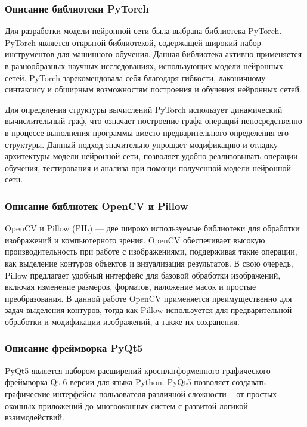 \subsubsection{Описание библиотеки PyTorch}
	
Для разработки модели нейронной сети была выбрана библиотека PyTorch. PyTorch является открытой библиотекой, содержащей широкий	набор инструментов для машинного обучения. Данная библиотека активно применяется в разнообразных научных исследованиях, использующих модели нейронных сетей. PyTorch зарекомендовала себя благодаря гибкости, лаконичному синтаксису и обширным возможностям построения и обучения нейронных сетей\cite{pointer_pytorch}. 

Для определения структуры вычислений PyTorch использует динамический вычислительный граф, что означает построение графа операций непосредственно в процессе выполнения программы вместо предварительного определения его структуры. Данный подход значительно упрощает модификацию и отладку архитектуры модели нейронной сети, позволяет удобно реализовывать операции обучения, тестирования и анализа при помощи полученной модели нейронной сети. 

\subsubsection{Описание библиотек OpenCV и Pillow}

OpenCV и Pillow (PIL) — две широко используемые библиотеки для обработки изображений и компьютерного зрения. OpenCV обеспечивает высокую производительность при работе с изображениями, поддерживая такие операции, как выделение контуров объектов и визуализация результатов. В свою очередь, Pillow предлагает удобный интерфейс для базовой обработки изображений, включая изменение размеров, форматов, наложение масок и простые преобразования. В данной работе OpenCV применяется преимущественно для задач выделения контуров, тогда как Pillow используется для предварительной обработки и модификации изображений, а также их сохранения. 

\subsubsection{Описание фреймворка PyQt5}

PyQt5 является набором расширений кросплатформенного графического фреймворка Qt 6 версии для языка Python. PyQt5 позволяет создавать графические интерфейсы пользователя различной сложности -- от простых оконных приложений до многооконных систем с развитой логикой взаимодействий. 

